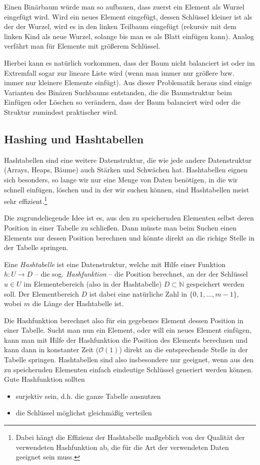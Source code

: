 Einen Binärbaum würde man so aufbauen, dass zuerst ein Element als
Wurzel eingefügt wird. Wird ein neues Element eingefügt, dessen
Schlüssel kleiner ist als der der Wurzel, wird es in den linken
Teilbaum eingefügt (rekursiv mit dem linken Kind als neue Wurzel,
solange bis man es als Blatt einfügen kann). Analog verfährt man für
Elemente mit größerem Schlüssel.

Hierbei kann es natürlich vorkommen, dass der Baum nicht balanciert
ist oder im Extremfall sogar zur lineare Liste wird (wenn man immer
nur größere bzw. immer nur kleinere Elemente einfügt). Aus dieser
Problematik heraus sind einige Varianten des Binären Suchbaums
entstanden, die die Baumstruktur beim Einfügen oder Löschen so
verändern, dass der Baum balanciert wird oder die Struktur zumindest
praktischer wird.

\subsection{Hashing und Hashtabellen}
Hashtabellen sind eine weitere Datenstruktur, die wie jede andere
Datenstruktur (Arrays, Heaps, Bäume) auch Stärken und Schwächen
hat. Hashtabellen eignen sich besonders, so lange wir nur eine Menge
von Daten benötigen, in die wir schnell einfügen, löschen und in der
wir suchen können, sind Hashtabellen meist sehr
effizient.\footnote{Dabei hängt die Effizienz der Hashtabelle
  maßgeblich von der Qualität der verwendeten Hashfunktion ab, die für
  die Art der verwendeten Daten geeignet sein muss.}

Die zugrundeliegende Idee ist es, aus den zu speichernden Elementen
selbst deren Position in einer Tabelle zu schließen. Dann müsste man
beim Suchen einen Elements nur dessen Position berechnen und könnte
direkt an die richige Stelle in der Tabelle springen.

\begin{defi}
  Eine \emph{Hashtabelle} ist eine Datenstruktur, welche mit Hilfe
  einer Funktion $h : U \rightarrow D$ -- die sog. \emph{Hashfunktion}
  -- die Position berechnet, an der der Schlüssel $u \in U$ im
  Elementebereich (also in der Hashtabelle) $D \subset \mathbb{N}$
  gespeichert werden soll. Der Elementbereich $D$ ist dabei eine
  natürliche Zahl in $\{0, 1, \dots, m-1\}$, wobei $m$ die Länge der
  Hashtabelle ist.
\end{defi}

Die Hashfunktion berechnet also für ein gegebenes Element dessen
Position in einer Tabelle. Sucht man nun ein Element, oder will ein
neues Element einfügen, kann man mit Hilfe der Hashfunktion die
Position des Elements berechnen und kann dann in konstanter Zeit
($\mathcal{O}(1)$) direkt an die entsprechende Stelle in der Tabelle
springen.
Hashtabellen sind also insbesondere nur geeignet, wenn aus den zu speichernden Elementen einfach eindeutige Schlüssel generiert werden können. \\
Gute Hashfunktion sollten
\begin{itemize}
\item surjektiv sein, d.h. die ganze Tabelle ausnutzen
\item die Schlüssel möglichst gleichmäßig verteilen
\end{itemize}

